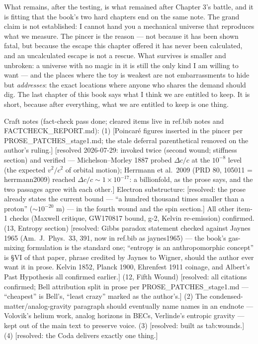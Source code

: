 \documentclass[fontsize=11pt,paper=a4,pagesize=auto,parskip=half-]{scrbook}
\newcommand\En{\centerline{\textemdash \qquad \ding{166} \qquad \textemdash}}
\newif\ifdraftnotes
\newenvironment{draftnote}{%
  \ifdraftnotes\par\small\itshape\color{black!60}\noindent[Craft notes: \ignorespaces
  \else\setbox0\vbox\bgroup\fi}{%
  \ifdraftnotes]\par\normalcolor\normalsize
  \else\egroup\fi}
\begin{document}
What remains, after the testing, is what remained after Chapter 3's battle, and it is fitting that the book's two hard chapters end on the same note. The grand claim is not established: I cannot hand you a mechanical universe that reproduces what we measure. The pincer is the reason --- not because it has been shown fatal, but because the escape this chapter offered it has never been calculated, and an uncalculated escape is not a rescue. What survives is smaller and unbroken: a universe with no magic in it is still the only kind I am willing to want --- and the places where the toy is weakest are not embarrassments to hide but \emph{addresses}: the exact locations where anyone who shares the demand should dig. The last chapter of this book says what I think we are entitled to keep. It is short, because after everything, what we are entitled to keep is one thing.

\En

\begin{draftnote}
Craft notes (fact-check pass done; cleared items live in ref.bib notes and FACTCHECK\_REPORT.md): (1) [Poincaré figures inserted in the pincer per PROSE\_PATCHES\_stage1.md; the stale deferral parenthetical removed on the author's ruling.] [resolved 2026-07-29: invoked twice (second wound; stiffness section) and verified --- Michelson--Morley 1887 probed $\Delta c/c$ at the $10^{-8}$ level (the expected $v^2/c^2$ of orbital motion); Herrmann et al.\ 2009 (PRD 80, 105011 = herrmann2009) reached $\Delta c/c \sim 1\times10^{-17}$: a billionfold, as the prose says, and the two passages agree with each other.] Electron substructure: [resolved: the prose already states the current bound --- ``a hundred thousand times smaller than a proton'' ($\sim10^{-20}$ m) --- in the fourth wound and the spin section.] All other item-1 checks (Maxwell critique, GW170817 bound, g-2, Kelvin re-emission) confirmed. (13, Entropy section) [resolved: Gibbs paradox statement checked against Jaynes 1965 (Am.~J.~Phys.~33, 391, now in ref.bib as jaynes1965) --- the book's gas-mixing formulation is the standard one; ``entropy is an anthropomorphic concept'' is \S{}VI of that paper, phrase credited by Jaynes to Wigner, should the author ever want it in prose. Kelvin 1852, Planck 1900, Ehrenfest 1911 coinage, and Albert's Past Hypothesis all confirmed earlier.] (12, Fifth Wound) [resolved: all citations confirmed; Bell attribution split in prose per PROSE\_PATCHES\_stage1.md --- ``cheapest'' is Bell's, ``least crazy'' marked as the author's.] (2) The condensed-matter/analog-gravity paragraph should eventually name names in an endnote --- Volovik's helium work, analog horizons in BECs, Verlinde's entropic gravity --- kept out of the main text to preserve voice. (3) [resolved: built as tab:wounds.] (4) [resolved: the Coda delivers exactly one thing.]
\end{draftnote}
\end{document}
